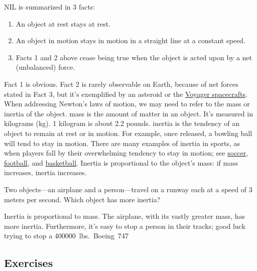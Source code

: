 \documentclass[main.tex]{subfiles}
\begin{document}
\begin{mdframed}[backgroundcolor=black!10]
\gls{NIL} is summarized in 3 facts:
\vspace{-1ex}

\begin{enumerate}
\setlength\itemsep{0ex}
    \item An object at rest stays at rest.
    \item An object in motion stays in motion in a straight line at a constant speed.
    \item Facts 1 and 2 above cease being true when the object is acted upon by a net (unbalanced) force.
\end{enumerate}
\end{mdframed}

Fact 1 is obvious. Fact 2 is rarely observable on Earth, because of net forces stated in Fact 3, but it's exemplified by an asteroid or the \href{https://voyager.jpl.nasa.gov/mission/status/}{Voyager spacecrafts}. When addressing Newton's laws of motion, we may need to refer to the mass or inertia of the object. \Gls{mass} is the amount of matter in an object. It's measured in kilograms (kg). 1 kilogram is about 2.2 pounds. \Gls{inertia} is the tendency of an object to remain at rest or in motion. For example, once released, a bowling ball will tend to stay in motion. There are many examples of inertia in sports, as when players fall by their overwhelming tendency to stay in motion; see \href{https://youtu.be/5PKXs8i_zSw?t=21}{soccer}, \href{https://youtu.be/4TgpW0WZZ6U?t=55}{football}, and \href{https://youtu.be/IGBpvIXGMYQ?t=26}{basketball}. Inertia is proportional to the object's mass: if mass increases, inertia increases.

\begin{example}
Two objects---an airplane and a person---travel on a runway each at a speed of 3 meters per second. Which object has more inertia?
\end{example}

\Solution Inertia is proportional to mass. The airplane, with its vastly greater mass, has more inertia. Furthermore, it's easy to stop a person in their tracks; good luck trying to stop a \SI{400000}{lbs.} Boeing 747.

\endsolution

\vspace{1em}

\cyanhrule


\subsection{Exercises}
\end{document}
